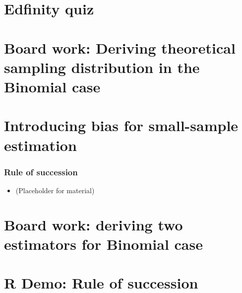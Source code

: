 \documentclass[t,compress,mathserif]{beamer}
\begin{document}


\section{Edfinity quiz}



\section{Board work: Deriving theoretical sampling distribution in the Binomial case}


\section{Introducing bias for small-sample estimation}


\begin{frame}
    \frametitle{Rule of succession}

    \begin{itemize}

        \item (Placeholder for material)

    \end{itemize}

\end{frame}


\section{Board work: deriving two estimators for Binomial case}


\section{R Demo: Rule of succession}

\end{document}
